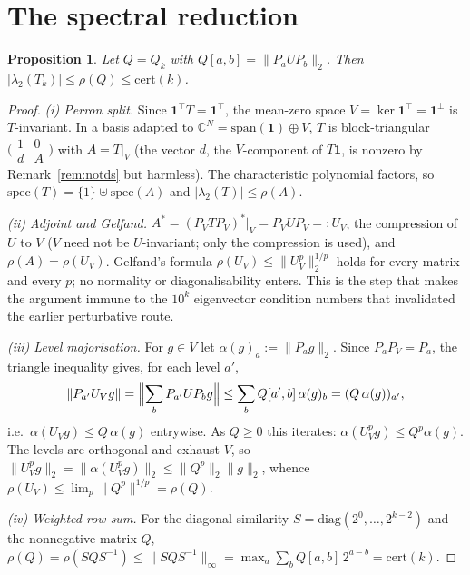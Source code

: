 \documentclass[12pt,a4paper]{article}
\newtheorem{proposition}[theorem]{Proposition}
\newcommand{\C}{\mathbb{C}}
\newcommand{\cert}{\mathrm{cert}}
\begin{document}
\section{The spectral reduction}\label{sec:reduction}

\begin{proposition}\label{prop:reduction}
Let $Q = Q_k$ with $Q[a,b] = \|P_a U P_b\|_2$. Then
$|\lambda_2(T_k)| \le \rho(Q) \le \cert(k)$.
\end{proposition}

\begin{proof}
\emph{(i) Perron split.} Since $\mathbf{1}^{\!\top} T = \mathbf{1}^{\!\top}$, the mean-zero space
$V = \ker \mathbf{1}^{\!\top} = \mathbf{1}^\perp$ is $T$-invariant. In a basis adapted to
$\C^N = \mathrm{span}(\mathbf{1}) \oplus V$, $T$ is block-triangular
$\bigl(\begin{smallmatrix} 1 & 0 \\ d & A \end{smallmatrix}\bigr)$ with $A = T|_V$ (the vector
$d$, the $V$-component of $T\mathbf{1}$, is nonzero by Remark~\ref{rem:notds} but harmless). The
characteristic polynomial factors, so $\mathrm{spec}(T) = \{1\} \uplus \mathrm{spec}(A)$ and
$|\lambda_2(T)| \le \rho(A)$.

\emph{(ii) Adjoint and Gelfand.} $A^\ast = (P_V T P_V)^\ast|_V = P_V U P_V =: U_V$, the
compression of $U$ to $V$ ($V$ need not be $U$-invariant; only the compression is used), and
$\rho(A) = \rho(U_V)$. Gelfand's formula $\rho(U_V) \le \|U_V^p\|_2^{1/p}$ holds for every matrix
and every $p$; no normality or diagonalisability enters. This is the step that makes the argument
immune to the $10^k$ eigenvector condition numbers that invalidated the earlier perturbative
route.

\emph{(iii) Level majorisation.} For $g \in V$ let $\alpha(g)_a := \|P_a g\|_2$. Since
$P_a P_V = P_a$, the triangle inequality gives, for each level $a'$,
\[
  \|P_{a'} U_V g\| = \Bigl\| \sum_b P_{a'} U P_b g \Bigr\|
  \le \sum_b Q[a', b]\, \alpha(g)_b = (Q\, \alpha(g))_{a'},
\]
i.e.\ $\alpha(U_V g) \le Q\,\alpha(g)$ entrywise. As $Q \ge 0$ this iterates:
$\alpha(U_V^p g) \le Q^p \alpha(g)$. The levels are orthogonal and exhaust $V$, so
$\|U_V^p g\|_2 = \|\alpha(U_V^p g)\|_2 \le \|Q^p\|_2 \|g\|_2$, whence
$\rho(U_V) \le \lim_p \|Q^p\|^{1/p} = \rho(Q)$.

\emph{(iv) Weighted row sum.} For the diagonal similarity $S = \mathrm{diag}(2^0, \dots, 2^{k-2})$
and the nonnegative matrix $Q$,
$\rho(Q) = \rho(S Q S^{-1}) \le \|S Q S^{-1}\|_\infty = \max_a \sum_b Q[a,b]\, 2^{a-b} = \cert(k)$.
\end{proof}
\end{document}
